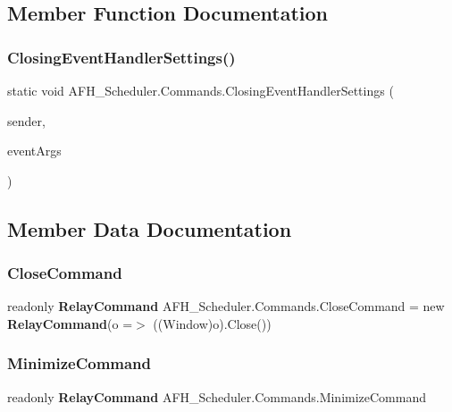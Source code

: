 \subsection{Member Function Documentation}
\mbox{\label{class_a_f_h___scheduler_1_1_commands_aa52a371f73558498c8ba1dd79b9f20a7}} 
\subsubsection{ClosingEventHandlerSettings()}
{\footnotesize\ttfamily static void A\+F\+H\+\_\+\+Scheduler.\+Commands.\+Closing\+Event\+Handler\+Settings (\begin{DoxyParamCaption}\item[{object}]{sender,  }\item[{Dialog\+Closing\+Event\+Args}]{event\+Args }\end{DoxyParamCaption})\hspace{0.3cm}{\ttfamily [static]}}



\subsection{Member Data Documentation}
\mbox{\label{class_a_f_h___scheduler_1_1_commands_a0e9a15fef4857a1fc327c55c4bd82b26}} 
\subsubsection{CloseCommand}
{\footnotesize\ttfamily readonly \textbf{ Relay\+Command} A\+F\+H\+\_\+\+Scheduler.\+Commands.\+Close\+Command = new \textbf{ Relay\+Command}(o =$>$ ((Window)o).Close())\hspace{0.3cm}{\ttfamily [static]}}

\mbox{\label{class_a_f_h___scheduler_1_1_commands_ac129378d4c164a7ff5d5a3eed7eae7cc}} 
\subsubsection{MinimizeCommand}
{\footnotesize\ttfamily readonly \textbf{ Relay\+Command} A\+F\+H\+\_\+\+Scheduler.\+Commands.\+Minimize\+Command\hspace{0.3cm}{\ttfamily [static]}}

